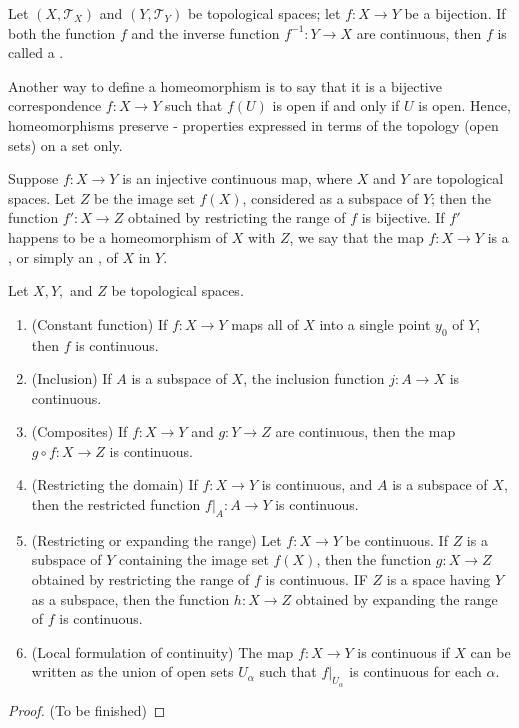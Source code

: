 \documentclass[12pt, a4paper, oneside, openright, titlepage]{book}
\begin{document}
\begin{definition}
    Let $(X,\mathcal{T}_X)$ and $(Y,\mathcal{T}_Y)$ be topological spaces; let $f:X\rightarrow Y$ be a bijection. If both the function $f$ and the inverse function $f^{-1}:Y\rightarrow X$ are continuous, then $f$ is called a .
\end{definition}

\begin{remark}
    Another way to define a homeomorphism is to say that it is a bijective correspondence $f:X\rightarrow Y$ such that $f(U)$ is open if and only if $U$ is open. Hence, homeomorphisms preserve  - properties expressed in terms of the topology (open sets) on a set only.
\end{remark}

\begin{definition}
    Suppose $f:X\rightarrow Y$ is an injective continuous map, where $X$ and $Y$ are topological spaces. Let $Z$ be the image set $f(X)$, considered as a subspace of $Y$; then the function $f':X\rightarrow Z$ obtained by restricting the range of $f$ is bijective. If $f'$ happens to be a homeomorphism of $X$ with $Z$, we say that the map $f:X\rightarrow Y$ is a , or simply an , of $X$ in $Y$.
\end{definition}



\begin{theorem}
    Let $X,Y,$ and $Z$ be topological spaces. \begin{enumerate}
        \item (Constant function) If $f:X\rightarrow Y$ maps all of $X$ into a single point $y_0$ of $Y$, then $f$ is continuous.
        \item (Inclusion) If $A$ is a subspace of $X$, the inclusion function $j:A\rightarrow X$ is continuous.
        \item (Composites) If $f:X\rightarrow Y$ and $g:Y\rightarrow Z$ are continuous, then the map $g\circ f:X\rightarrow Z$ is continuous.
        \item (Restricting the domain) If $f:X\rightarrow Y$ is continuous, and $A$ is a subspace of $X$, then the restricted function $f\rvert_A:A\rightarrow Y$ is continuous. 
        \item (Restricting or expanding the range) Let $f:X\rightarrow Y$ be continuous. If $Z$ is a subspace of $Y$ containing the image set $f(X)$, then the function $g:X\rightarrow Z$ obtained by restricting the range of $f$ is continuous. IF $Z$ is a space having $Y$ as a subspace, then the function $h:X\rightarrow Z$ obtained by expanding the range of $f$ is continuous. 
        \item (Local formulation of continuity) The map $f:X\rightarrow Y$ is continuous if $X$ can be written as the union of open sets $U_{\alpha}$ such that $f\rvert_{U_{\alpha}}$ is continuous for each $\alpha$.
    \end{enumerate}
\end{theorem}
\begin{proof}
    (To be finished)
\end{proof}
\end{document}
